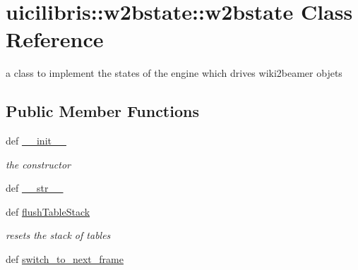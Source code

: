 \hypertarget{classuicilibris_1_1w2bstate_1_1w2bstate}{\section{uicilibris\-:\-:w2bstate\-:\-:w2bstate \-Class \-Reference}
\label{classuicilibris_1_1w2bstate_1_1w2bstate}
}


a class to implement the states of the engine which drives wiki2beamer objets  


\subsection*{\-Public \-Member \-Functions}
\begin{DoxyCompactItemize}
\item 
def \hyperlink{classuicilibris_1_1w2bstate_1_1w2bstate_ad77298f823ae0099f016ab02e6807265}{\-\_\-\-\_\-init\-\_\-\-\_\-}
\begin{DoxyCompactList}\small\item\em the constructor \end{DoxyCompactList}\item 
def \hyperlink{classuicilibris_1_1w2bstate_1_1w2bstate_aa9ecf6cc4a1a5fe5119ee2ac35533760}{\-\_\-\-\_\-str\-\_\-\-\_\-}
\item 
def \hyperlink{classuicilibris_1_1w2bstate_1_1w2bstate_a8dcf3b9ea0d3995f3df4554384a07fe3}{flush\-Table\-Stack}
\begin{DoxyCompactList}\small\item\em resets the stack of tables \end{DoxyCompactList}\item 
def \hyperlink{classuicilibris_1_1w2bstate_1_1w2bstate_af91ee722985bd758a8973065c7c317c3}{switch\-\_\-to\-\_\-next\-\_\-frame}
\end{DoxyCompactItemize}
